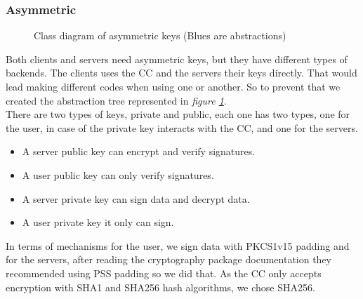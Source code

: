 \documentclass[12pt]{article}
\begin{document}
\subsubsection{Asymmetric}
\begin{figure}[h]
  \caption{Class diagram of asymmetric keys (Blues are abstractions)}
  \label{fig:asymmetric}
\end{figure}
Both clients and servers need asymmetric keys, but they have different types of
  backends. The clients uses the CC and the servers their keys directly.
  That would lead making different codes when using one or another. So to prevent that
  we created the abstraction tree  represented in \textit{figure \ref{fig:asymmetric}}. \\
There are two types of keys, private and public, each one has two types, one for the user, 
  in case of the private key interacts with the CC, and one for the servers. \\

  \begin{itemize}
  \item A server public key can encrypt and verify signatures. 
  \item A user public key can only verify signatures. 
  \item A server private key can sign data and decrypt data. 
  \item A user private key it only can sign. 
  \end{itemize} 

In terms of mechanisms for the user, we sign data with PKCS1v15 padding and for the servers, after reading
  the cryptography package documentation they recommended using PSS padding so we did that.
  As the CC only accepts encryption with SHA1 and SHA256 hash algorithms, we chose  SHA256.
\end{document}
